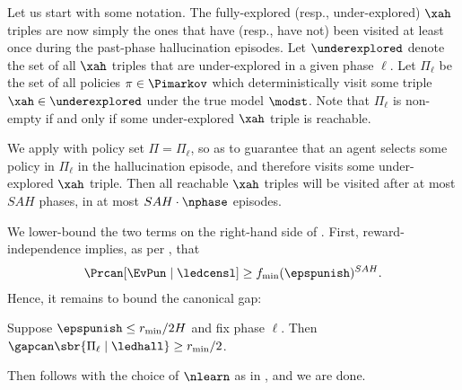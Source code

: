 Let us start with some notation. The fully-explored (resp., under-explored) $\xah$ triples are now simply the ones that have (resp., have not) been visited at least once during the past-phase hallucination episodes. Let $\underexplored$ denote the set of all $\xah$ triples that are under-explored in a given phase $\ell$. Let $\Pi_{\ell}$ be the set of all policies $\pi\in \Pimarkov$ which deterministically visit some triple $\xah\in \underexplored$ under the true model $\modst$. Note that $\Pi_\ell$ is non-empty if and only if some under-explored $\xah$ triple is reachable.



We apply  with policy set $\Pi = \Pi_\ell$, so as to guarantee that an agent selects some policy in $\Pi_\ell$ in the hallucination episode, and therefore visits some under-explored $\xah$ triple. Then all reachable $\xah$ triples will be visited after at most $SAH$ phases, \ie in at most $SAH \cdot \nphase$ episodes.

We lower-bound the two terms on the right-hand side of . First, reward-independence implies, as per , that
\begin{align*}
\Prcan[\EvPun \mid \ledcensl] \ge f_{\min}(\epspunish)^{SAH}.
\end{align*}
Hence, it remains to bound the canonical gap:

\begin{claim}\label{claim:gap_size}
Suppose $\epspunish \le r_{\min}/2H$ and fix phase $\ell$. Then
    $\gapcan\sbr{\Pi_{\ell} \mid \ledhall} \geq r_{\min}/2$.
\end{claim}

Then  follows with the choice of $\nlearn$ as in , and we are done.

